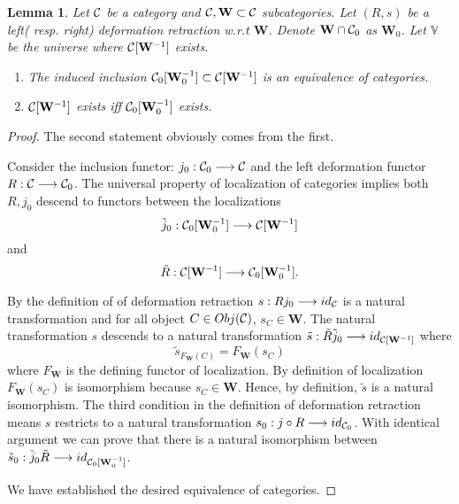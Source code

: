 \documentclass[11pt]{article}
\newtheorem{lemma}[thm]{Lemma}
\newcommand{\calc}{{\cal C}}
\newcommand{\lrta}{\longrightarrow}
\begin{document}
\begin{lemma}
Let $\calc$ be a category and $\calc, \mathbf{W}\subset \calc$ subcategories. Let $(R,s)$ be a left( resp. right) deformation retraction w.r.t $\mathbf{W}$. Denote $\mathbf{W}\cap \calc_0$ as $\mathbf{W}_0$. Let $\mathbb{V}$ be the universe where $\calc[\mathbf{W}^{-1}]$ exists.
\begin{enumerate}
\item The induced inclusion $\calc_0[\mathbf{W}_0^{-1}]\subset \calc[\mathbf{W}^{-1}]$ is an equivalence of categories. 
\item $\calc[\mathbf{W}^{-1}]$ exists iff $\calc_0[\mathbf{W}_0^{-1}]$ exists.
\end{enumerate}
\end{lemma}
\begin{proof}
The second statement obviously comes from the first.

Consider the inclusion functor: $j_0:\calc_0\lrta \calc$ and the left deformation functor $R:\calc\lrta \calc_0$. The universal property of localization of categories implies both $R,j_0$ descend to functors between the localizations
$$
\tilde{j}_0:\calc_0[\mathbf{W}_0^{-1}]\lrta \calc[\mathbf{W}^{-1}]
$$
and
$$
\tilde{R}:\calc[\mathbf{W}^{-1}]\lrta \calc_0[\mathbf{W}_0^{-1}].
$$

By the definition of of deformation retraction $s: R j_0\lrta id_\calc$ is a natural transformation and for all object $C\in Obj(\calc)$, $s_C\in \mathbf{W}$.  The natural transformation $s$ descends to a natural transformation
$\tilde{s}:\tilde{R}\tilde{j}_0\lrta id_{\calc[\mathbf{W}^{-1}]}$
where 
$$
\tilde{s}_{F_\mathbf{W}(C)}=F_{\mathbf{W}}(s_C)
$$
where $F_\mathbf{W}$ is the defining functor of localization. By definition of localization $F_\mathbf{W}(s_C)$ is isomorphism because $s_C\in \mathbf{W}$. Hence, by definition, $\tilde{s}$ is a natural isomorphism. The third condition in the definition of deformation retraction means $s$ restricts to a natural transformation $s_0:j\circ R\lrta id_{\calc_0}$. With identical argument we can prove that there is a natural isomorphism between $\tilde{s}_0:\tilde{j}_0\tilde{R}\lrta id_{\calc_0[\mathbf{W}_0^{-1}]}$. 

We have established the desired equivalence of categories.
\end{proof}
\end{document}
